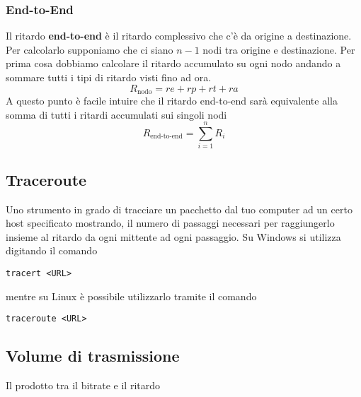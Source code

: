 \subsubsection{End-to-End}
Il ritardo \textbf{end-to-end} è il ritardo complessivo che c'è da origine a destinazione. Per 
calcolarlo supponiamo che ci siano $n-1$ nodi tra origine e destinazione. Per prima cosa dobbiamo
calcolare il ritardo accumulato su ogni nodo andando a sommare tutti i tipi di ritardo visti fino
ad ora.
\[ R_{\text{nodo}} = re + rp + rt + ra \]
A questo punto è facile intuire che il ritardo end-to-end sarà equivalente alla somma di tutti i
ritardi accumulati sui singoli nodi
\[ R_\text{end-to-end} = \sum_{i=1}^n R_i \]

\subsection{Traceroute}
Uno strumento in grado di tracciare un pacchetto dal tuo computer ad un certo host specificato
mostrando, il numero di passaggi necessari per raggiungerlo insieme al ritardo da ogni mittente
ad ogni passaggio.
Su Windows si utilizza digitando il comando
\begin{center}
	\verb|tracert <URL>|
\end{center}
mentre su Linux è possibile utilizzarlo tramite il comando 
\begin{center}
	\verb|traceroute <URL>|
\end{center}

\subsection{Volume di trasmissione}
Il prodotto tra il bitrate e il ritardo 
